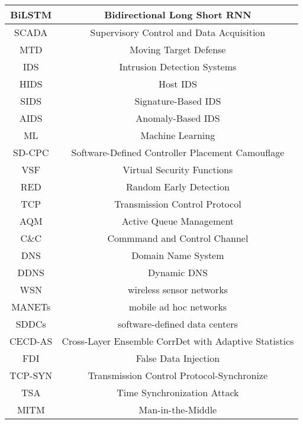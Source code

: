 \documentclass[conference]{IEEEtran}
\begin{document}
\begin{table}[ht]
\begin{tabular}{|c|c|}
BiLSTM & Bidirectional Long Short RNN \\ \hline
SCADA & Supervisory Control and Data Acquisition \\ \hline
MTD & Moving Target Defense \\ \hline
IDS & Intrusion Detection Systems \\ \hline
HIDS & Host IDS \\ \hline
SIDS & Signature-Based IDS \\ \hline
AIDS & Anomaly-Based IDS \\ \hline
ML & Machine Learning \\ \hline
SD-CPC & Software-Defined Controller Placement Camouflage \\ \hline
VSF & Virtual Security Functions \\ \hline
RED &  Random Early Detection \\ \hline
TCP & Transmission Control Protocol \\ \hline
AQM & Active Queue Management \\ \hline
C\&C & Commmand
and Control Channel \\ \hline
DNS &  Domain Name System \\ \hline
DDNS & Dynamic DNS \\ \hline
WSN & wireless sensor networks \\ \hline
MANETs & mobile ad hoc networks \\ \hline
SDDCs & software-defined data centers \\ \hline
CECD-AS & Cross-Layer Ensemble CorrDet with Adaptive Statistics \\ \hline
FDI & False Data Injection \\ \hline
TCP-SYN & Transmission Control Protocol-Synchronize \\ \hline
TSA & Time Synchronization Attack \\ \hline
MITM & Man-in-the-Middle \\ \hline

\end{tabular}
\end{table}
\end{document}
